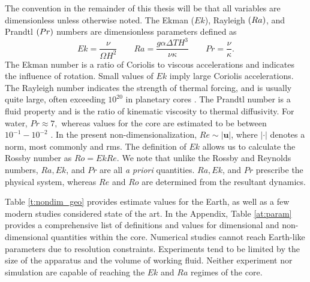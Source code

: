 The convention in the remainder of this thesis will be that all variables are dimensionless unless otherwise noted. 
The Ekman ($Ek$), Rayleigh $\left ( Ra\right ) $, and Prandtl $\left ( Pr\right ) $ numbers are dimensionless parameters defined as
\[Ek = \frac{\nu}{\Omega H^{2}}\qquad Ra = \frac{g\alpha \Delta T H^{3}}{\nu\kappa} \qquad Pr =\frac{\nu}{\kappa}.\]
The Ekman number is a ratio of Coriolis to viscous accelerations and indicates the influence of rotation. Small values of $Ek$ imply large Coriolis accelerations. 
The Rayleigh number indicates the strength of thermal forcing, and is usually quite large, often exceeding $10^{20}$ in planetary cores \citep[e.g.][]{dL23}. The Prandtl number is a fluid property and is the ratio of kinematic viscosity to thermal diffusivity. 
For water, $ Pr\approx7,$ whereas values for the core are estimated to be between $10^{-1}-10^{-2}$ \citep{gW98}.
In the present non-dimensionalization, $Re \sim \left|\mathbf{u}\right|$, where $|\cdot|$ denotes a norm, most commonly and rms. The definition of $Ek$ allows us to calculate the Rossby number as $Ro = EkRe.$ 
We note that unlike the Rossby and Reynolds numbers, $Ra,Ek$, and $Pr$ are all \textit{a priori} quantities. $Ra,Ek$, and $Pr$ prescribe the physical system, whereas $Re$ and $Ro$ are determined from the resultant dynamics.

Table \ref{t:nondim_geo} provides estimate values for the Earth, as well as a few modern studies considered state of the art. In the Appendix, Table \ref{at:param} provides a comprehensive list of definitions and values for dimensional and non-dimensional quantities within the core. 
Numerical studies cannot reach Earth-like parameters due to resolution constraints.
Experiments tend to be limited by the size of the apparatus and the volume of working fluid. 
Neither experiment nor simulation are capable of reaching the $Ek$ and $Ra$ regimes of the core.


